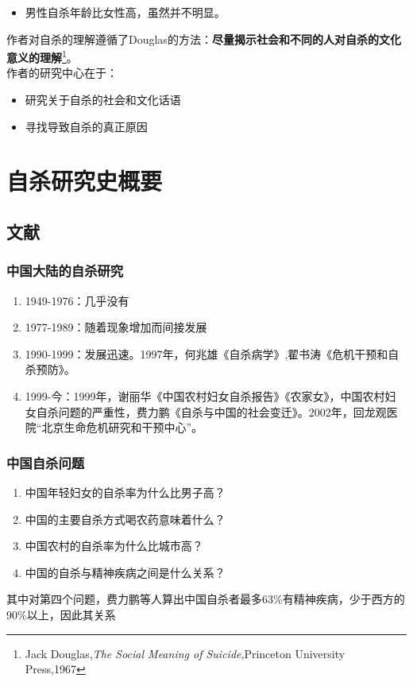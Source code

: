 \documentclass[UTF8]{book}
\begin{document}
\begin{enumerate}
\begin{itemize}
            \item 男性自杀年龄比女性高，虽然并不明显。
        \end{itemize}
        作者对自杀的理解遵循了Douglas的方法：\textbf{尽量揭示社会和不同的人对自杀的文化意义的理解}\footnote{Jack Douglas,\emph{The Social Meaning of Suicide},Princeton University Press,1967}。\\
        作者的研究中心在于：
        \begin{itemize}
            \item 研究关于自杀的社会和文化话语
            \item 寻找导致自杀的真正原因
        \end{itemize}
\end{enumerate}

\section{自杀研究史概要}
    \subsection{文献}
        \subsubsection{中国大陆的自杀研究}
            \begin{enumerate}
                \item 1949-1976：几乎没有
                \item 1977-1989：随着现象增加而间接发展
                \item 1990-1999：发展迅速。1997年，何兆雄《自杀病学》,翟书涛《危机干预和自杀预防》。
                \item 1999-今：1999年，谢丽华《中国农村妇女自杀报告》《农家女》，中国农村妇女自杀问题的严重性，费力鹏《自杀与中国的社会变迁》。2002年，回龙观医院“北京生命危机研究和干预中心”。
            \end{enumerate}
        \subsubsection{中国自杀问题}
            \begin{enumerate}
                \item 中国年轻妇女的自杀率为什么比男子高？
                \item 中国的主要自杀方式喝农药意味着什么？
                \item 中国农村的自杀率为什么比城市高？
                \item 中国的自杀与精神疾病之间是什么关系？
            \end{enumerate}
            其中对第四个问题，费力鹏等人算出中国自杀者最多63\%有精神疾病，少于西方的90\%以上，因此其关系
\end{document}
